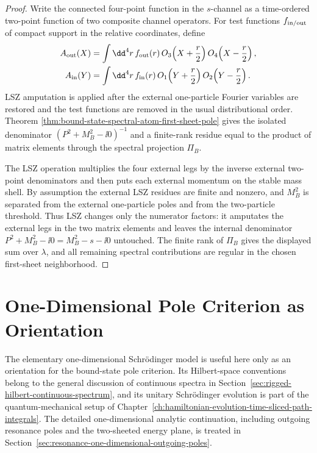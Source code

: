 \begin{proof}
Write the connected four-point function in the \(s\)-channel as a
time-ordered two-point function of two composite channel operators.  For
test functions \(f_{\rm in/out}\) of compact support in the relative
coordinates, define
\[
\begin{aligned}
  A_{\rm out}(X)
  &=
  \int\dd^4r\,f_{\rm out}(r)\,
  O_3\!\left(X+\frac r2\right)
  O_4\!\left(X-\frac r2\right),\\
  A_{\rm in}(Y)
  &=
  \int\dd^4r\,f_{\rm in}(r)\,
  O_1\!\left(Y+\frac r2\right)
  O_2\!\left(Y-\frac r2\right).
\end{aligned}
\]
LSZ amputation is applied after the external one-particle Fourier variables
are restored and the test functions are removed in the usual distributional
order.  Theorem
\ref{thm:bound-state-spectral-atom-first-sheet-pole} gives the isolated
denominator \((P^2+M_B^2-\ii0)^{-1}\) and a finite-rank residue equal to the
product of matrix elements through the spectral projection \(\Pi_B\).

The LSZ operation multiplies the four external legs by the inverse external
two-point denominators and then puts each external momentum on the stable
mass shell.  By assumption the external LSZ residues are finite and nonzero,
and \(M_B^2\) is separated from the external one-particle poles and from the
two-particle threshold.  Thus LSZ changes only the numerator factors: it
amputates the external legs in the two matrix elements and leaves the
internal denominator \(P^2+M_B^2-\ii0=M_B^2-s-\ii0\) untouched.  The finite
rank of \(\Pi_B\) gives the displayed sum over \(\lambda\), and all remaining
spectral contributions are regular in the chosen first-sheet neighborhood.
\end{proof}

\section{One-Dimensional Pole Criterion as Orientation}
\label{sec:bound-state-one-dimensional-orientation}

The elementary one-dimensional Schr\"odinger model is useful here only as an
orientation for the bound-state pole criterion.  Its Hilbert-space conventions
belong to the general discussion of continuous spectra in
Section~\ref{sec:rigged-hilbert-continuous-spectrum}, and its unitary
Schr\"odinger evolution is part of the quantum-mechanical setup of
Chapter~\ref{ch:hamiltonian-evolution-time-sliced-path-integrals}.  The
detailed one-dimensional analytic continuation, including outgoing resonance
poles and the two-sheeted energy plane, is treated in
Section~\ref{sec:resonance-one-dimensional-outgoing-poles}.

